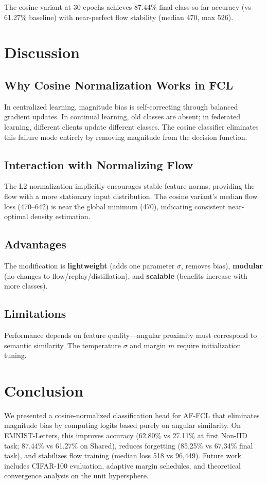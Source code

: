 \documentclass[conference]{IEEEtran}
\begin{document}
The cosine variant at 30 epochs achieves 87.44\% final class-so-far accuracy (vs 61.27\% baseline) with near-perfect flow stability (median 470, max 526).

\section{Discussion}

\subsection{Why Cosine Normalization Works in FCL}
In centralized learning, magnitude bias is self-correcting through balanced gradient updates. In continual learning, old classes are absent; in federated learning, different clients update different classes. The cosine classifier eliminates this failure mode entirely by removing magnitude from the decision function.

\subsection{Interaction with Normalizing Flow}
The L2 normalization implicitly encourages stable feature norms, providing the flow with a more stationary input distribution. The cosine variant's median flow loss (470--642) is near the global minimum (470), indicating consistent near-optimal density estimation.

\subsection{Advantages}
The modification is \textbf{lightweight} (adds one parameter $\sigma$, removes bias), \textbf{modular} (no changes to flow/replay/distillation), and \textbf{scalable} (benefits increase with more classes).

\subsection{Limitations}
Performance depends on feature quality---angular proximity must correspond to semantic similarity. The temperature $\sigma$ and margin $m$ require initialization tuning.

\section{Conclusion}

We presented a cosine-normalized classification head for AF-FCL that eliminates magnitude bias by computing logits based purely on angular similarity. On EMNIST-Letters, this improves accuracy (62.80\% vs 27.11\% at first Non-IID task; 87.44\% vs 61.27\% on Shared), reduces forgetting (85.25\% vs 67.34\% final task), and stabilizes flow training (median loss 518 vs 96,449). Future work includes CIFAR-100 evaluation, adaptive margin schedules, and theoretical convergence analysis on the unit hypersphere.
\end{document}
